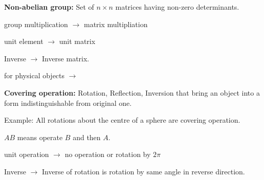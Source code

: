 \noindent
{\bf Non-abelian group:} Set of $n\times n$ matrices having non-zero determinants.

group multiplication $\to$ matrix multipliation

unit element $\to$ unit matrix

Inverse $\to$ Inverse matrix.


\noindent
for physical objects $\to$

\noindent
{\bf Covering operation:} Rotation, Reflection, Inversion that bring an object into a form indistinguishable from original one.

\noindent
Example: All rotations about the centre of a sphere are covering operation.

$AB$ means operate $B$ and then $A$.

unit operation $\to$ no operation or rotation by $2\pi$

Inverse $\to$ Inverse of rotation is rotation by same angle in reverse direction.

